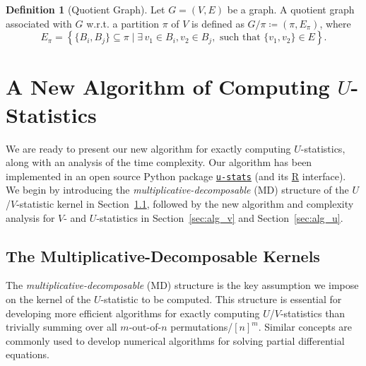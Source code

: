 \documentclass[sn-mathphys, natbib=false]{sn-jnl}
\newcommand{\pdfu}{\texorpdfstring{$U$}{U}}
\newcommand{\libref}[2]{\href{#2}{\texttt{#1}}}
\def\package{\libref{u-stats}{https://github.com/zrq1706/U-Statistics-Python}}
\theoremstyle{plain}
\theoremstyle{definition}
\newtheorem{definition}{Definition}
\newcommand{\sPi}{\pi}
\def\package{\libref{u-stats}{https://github.com/zrq1706/U-Statistics-Python}}
\begin{document}
\begin{bibunit}[agsm]
\begin{definition}[Quotient Graph]
\label{def:quotient_graph}
Let $G = (V, E)$ be a graph. A quotient graph associated with $G$ w.r.t. a partition $\sPi$ of $V$ is defined as $G/\pi \coloneqq (\pi, E_{\pi})$, where
\begin{equation*}
    E_\pi = \left\{\{B_i,B_j\} \subseteq \pi \mid \exists \, v_1 \in B_i, v_2 \in B_j, \text{ such that } \{v_1, v_2\} \in E\right\}. 
\end{equation*}
\end{definition}


\section{A New Algorithm of Computing \pdfu{}-Statistics}
\label{sec:alg_u_v}

We are ready to present our new algorithm for exactly computing $U$-statistics, along with an analysis of the time complexity. Our algorithm has been implemented in an open source Python package \package{} (and its \href{https://github.com/cxy0714/U-Statistics-R}{R} interface). We begin by introducing the \emph{multiplicative-decomposable} (MD) structure of the $U$/$V$-statistic kernel in Section~\ref{sec:decomposition}, followed by the new algorithm and complexity analysis for $V$- and $U$-statistics in Section~\ref{sec:alg_v} and Section~\ref{sec:alg_u}.


\subsection{The Multiplicative-Decomposable Kernels}
\label{sec:decomposition}

The \emph{multiplicative-decomposable} (MD) structure is the key assumption we impose on the kernel of the $U$-statistic to be computed. This structure is essential for developing more efficient algorithms for exactly computing $U$/$V$-statistics than trivially summing over all $m$-out-of-$n$ permutations/$[n]^{m}$. Similar concepts are commonly used to develop numerical algorithms for solving partial differential equations.


\end{bibunit}
\end{document}
